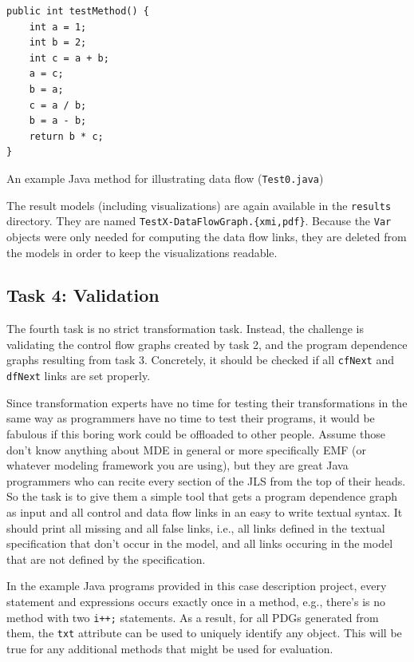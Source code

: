\documentclass[11pt]{article}
\begin{document}
\begin{listing}
  \begin{verbatim}
public int testMethod() {
    int a = 1;
    int b = 2;
    int c = a + b;
    a = c;
    b = a;
    c = a / b;
    b = a - b;
    return b * c;
}
  \end{verbatim}
  \caption{An example Java method for illustrating data flow
    (\texttt{Test0.java})}
  \label{lst:java-ex-df}
\end{listing}


The result models (including visualizations) are again available in the
\verb|results| directory.  They are named \verb|TestX-DataFlowGraph.{xmi,pdf}|.
Because the \verb|Var| objects were only needed for computing the data flow
links, they are deleted from the models in order to keep the visualizations
readable.

\subsection{Task 4: Validation}
\label{sec:task4-validation}

The fourth task is no strict transformation task.  Instead, the challenge is
validating the control flow graphs created by task 2, and the program
dependence graphs resulting from task 3.  Concretely, it should be checked if
all \verb|cfNext| and \verb|dfNext| links are set properly.

Since transformation experts have no time for testing their transformations in
the same way as programmers have no time to test their programs, it would be
fabulous if this boring work could be offloaded to other people.  Assume those
don't know anything about MDE in general or more specifically EMF (or whatever
modeling framework you are using), but they are great Java programmers who can
recite every section of the JLS \cite{Java7Spec} from the top of their heads.
So the task is to give them a simple tool that gets a program dependence graph
as input and all control and data flow links in an easy to write textual
syntax.  It should print all missing and all false links, i.e., all links
defined in the textual specification that don't occur in the model, and all
links occuring in the model that are not defined by the specification.

In the example Java programs provided in this case description project, every
statement and expressions occurs exactly once in a method, e.g., there's is no
method with two \verb|i++;| statements.  As a result, for all PDGs generated
from them, the \verb|txt| attribute can be used to uniquely identify any
object.  This will be true for any additional methods that might be used for
evaluation.
\end{document}
